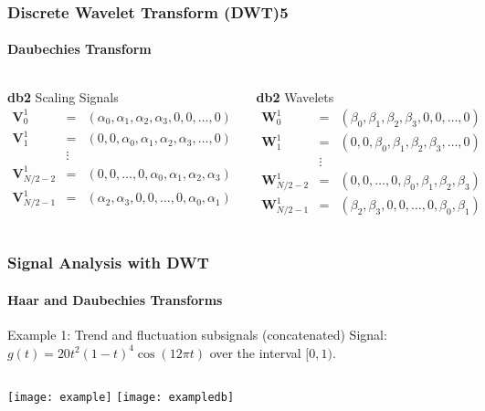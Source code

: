 \documentclass[9pt]{beamer}
\begin{document}
\begin{frame}
\frametitle{Discrete Wavelet Transform (DWT)\hfill{5}}
\framesubtitle{Daubechies Transform}

\begin{columns}
\begin{block}{\textbf{db2} Scaling Signals}
{\scriptsize
\begin{eqnarray*}
\mathbf{V}_{0}^{1} & = & ( \alpha_{0},\alpha_{1},\alpha_{2},\alpha_{3},0,0,\ldots,0 ) \nonumber \\
\mathbf{V}_{1}^{1} & = & ( 0,0,\alpha_{0},\alpha_{1},\alpha_{2},\alpha_{3},\ldots,0 ) \nonumber \\
	 & \vdots & 	\nonumber \\
\mathbf{V}_{N/2-2}^{1} & = & ( 0,0,\ldots,0,\alpha_{0},\alpha_{1},\alpha_{2},\alpha_{3} ) \nonumber \\ 
\mathbf{V}_{N/2-1}^{1} & = & ( \alpha_{2},\alpha_{3},0,0,\ldots,0,\alpha_{0},\alpha_{1} )  
\end{eqnarray*}
}
\end{block}
\begin{block}{\textbf{db2} Wavelets}
{\scriptsize
\begin{eqnarray*}
\mathbf{W}_{0}^{1} & = & ( \beta_{0},\beta_{1},\beta_{2},\beta_{3},0,0,\ldots,0 ) \nonumber \\
\mathbf{W}_{1}^{1} & = & ( 0,0,\beta_{0},\beta_{1},\beta_{2},\beta_{3},\ldots,0 ) \nonumber \\
	 & \vdots & 	\nonumber \\
\mathbf{W}_{N/2-2}^{1} & = & ( 0,0,\ldots,0,\beta_{0},\beta_{1},\beta_{2},\beta_{3} ) \nonumber \\ 
\mathbf{W}_{N/2-1}^{1} & = & ( \beta_{2},\beta_{3},0,0,\ldots,0,\beta_{0},\beta_{1} )  
\end{eqnarray*}
}
\end{block}
\end{columns}
\end{frame}

\begin{frame}
\frametitle{Signal Analysis with DWT}
\framesubtitle{Haar and Daubechies Transforms}
\begin{block}{Example 1: Trend and fluctuation subsignals (concatenated)}
Signal: $g(t)=20t^{2}(1-t)^{4}\cos(12\pi t)$ over the interval $[0,1)$. 
\end{block}
 
\begin{columns}
\texttt{[image: example]}
\texttt{[image: exampledb]}
\end{columns}
\end{frame}
\end{document}
